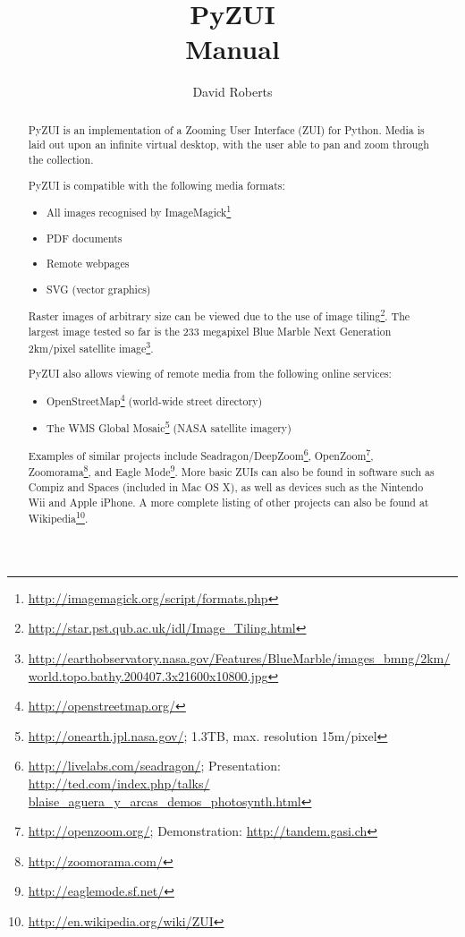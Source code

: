\documentclass{report}
\title{{\Huge \bfseries PyZUI}\\Manual}
\author{David Roberts}
\begin{document}
  \maketitle
  \dominitoc
  \faketableofcontents

  \begin{abstract}
  PyZUI is an implementation of a Zooming User Interface (ZUI) for Python.
  Media is laid out upon an infinite virtual desktop, with the user able to pan
  and zoom through the collection.

  PyZUI is compatible with the following media formats:
  \begin{itemize}
    \item All images recognised by ImageMagick\footnote{
            \url{http://imagemagick.org/script/formats.php}
          }
    \item PDF documents
    \item Remote webpages
    \item SVG (vector graphics)
  \end{itemize}

  Raster images of arbitrary size can be viewed due to the use of image
  tiling\footnote{
    \url{http://star.pst.qub.ac.uk/idl/Image_Tiling.html}
  }. The largest image tested so far is the 233 megapixel Blue Marble Next
  Generation 2km/pixel satellite image\footnote{
    \url{http://earthobservatory.nasa.gov/Features/BlueMarble/images_bmng/2km/
         world.topo.bathy.200407.3x21600x10800.jpg}
  }.

  PyZUI also allows viewing of remote media from the following online services:
  \begin{itemize}
    \item OpenStreetMap\footnote{
            \url{http://openstreetmap.org/}
          } (world-wide street directory)
    \item The WMS Global Mosaic\footnote{
            \url{http://onearth.jpl.nasa.gov/};
            1.3TB, max. resolution 15m/pixel
          } (NASA satellite imagery)
  \end{itemize}

  Examples of similar projects include Seadragon/DeepZoom\footnote{
    \url{http://livelabs.com/seadragon/};
    Presentation: \url{http://ted.com/index.php/talks/
                       blaise_aguera_y_arcas_demos_photosynth.html}
  }, OpenZoom\footnote{
    \url{http://openzoom.org/};
    Demonstration: \url{http://tandem.gasi.ch}
  }, Zoomorama\footnote{
    \url{http://zoomorama.com/}
  }, and Eagle Mode\footnote{
    \url{http://eaglemode.sf.net/}
  }. More basic ZUIs can also be found in software such as Compiz and Spaces
  (included in Mac OS X), as well as devices such as the Nintendo Wii and Apple
  iPhone. A more complete listing of other projects can also be found at
  Wikipedia\footnote{
    \url{http://en.wikipedia.org/wiki/ZUI}
  }.
  \end{abstract}
\end{document}
